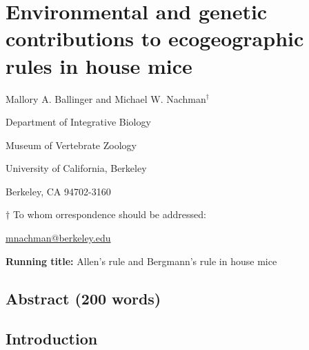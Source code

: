 \documentclass[]{article}
\author{}
\date{\vspace{-2.5em}}
\begin{document}
\hypertarget{environmental-and-genetic-contributions-to-ecogeographic-rules-in-house-mice}{%
\section{Environmental and genetic contributions to ecogeographic rules
in house
mice}\label{environmental-and-genetic-contributions-to-ecogeographic-rules-in-house-mice}}

\vspace{20mm}

Mallory A. Ballinger and Michael W. Nachman\({^\dagger}\)

\vspace{20mm}

Department of Integrative Biology

Museum of Vertebrate Zoology

University of California, Berkeley

Berkeley, CA 94702-3160

\vspace{10mm}

\({\dagger}\) To whom orrespondence should be addressed:

\href{mailto:mnachman@berkeley.edu}{mnachman@berkeley.edu}

\vspace{40mm}

\textbf{Running title:} Allen's rule and Bergmann's rule in house mice

\newpage

\hypertarget{abstract-200-words}{%
\subsection{Abstract (200 words)}\label{abstract-200-words}}

\newpage

\hypertarget{introduction}{%
\subsection{Introduction}\label{introduction}}
\end{document}
